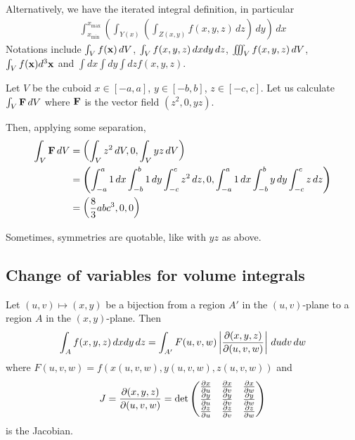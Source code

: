 \documentclass{../../template/note}
\begin{document}
    Alternatively, we have the iterated integral definition, in particular
    \begin{align*}
        \int_{x_{\min}}^{x_\text{max}}\left(\int_{Y(x)}\left(\int_{Z(x,y)}f(x, y, z) \, dz\right) \, dy\right) \, dx
    \end{align*}
    Notations include \(\int_V f(\V x) \D V\), \(\int_V f(x, y, z) \,d{x} dy \, dz\), \(\iiint_V f(x, y, z) \,d{V}\), \(\int_V f(\V x) d^3 \V x\) and \(\int dx \int dy \int dz f(x, y, z)\).

    \begin{example*}
        Let \(V\) be the cuboid \(x \in [-a, a]\), \(y \in [-b, b]\), \(z \in [-c, c]\). Let us calculate \(\int_V \V F \D V\) where \(\V F\) is the vector field \((z^2, 0, yz)\).

        Then, applying some separation,
        \begin{align*}
            \int_V \V F \D V &= \left(\int_V z^2 \D V, 0, \int_V yz \D V\right) \\
            &= \left(\int_{-a}^a 1 \D x \int_{-b}^b 1 \D y \int_{-c}^c z^2 \D z, 0, \int_{-a}^a 1 \D x \int_{-b}^b y \D y \int_{-c}^c z \D z\right) \\
            &= \left(\frac 8 3 abc^3, 0, 0\right)
        \end{align*}
    \end{example*}
    
    \begin{remark*}
        Sometimes, symmetries are quotable, like with \(yz\) as above.
    \end{remark*}
    
    \subsection{Change of variables for volume integrals}
    
    \begin{proposition*}
        Let \((u, v) \mapsto (x, y)\) be a bijection from a region \(A'\) in the \((u, v)\)-plane to a region \(A\) in the \((x, y)\)-plane. Then
        \begin{align*}
            \int_A f(x, y, z) \D x dy \, dz = \int_{A'} F(u, v, w) \left|\pd{(x,y,z)}{(u, v,w)}\right| \D u dv \, dw \\
        \end{align*}
        where \(F(u, v, w) = f(x(u, v, w), y(u, v, w), z(u, v, w))\) and
        \begin{align*}
            J = \pd{(x,y,z)}{(u, v,w)} = \det \begin{pmatrix}
            \pd x u & \pd x v & \pd x w \\
            \pd y u & \pd y v & \pd y w \\
            \pd z u & \pd z v & \pd z w
            \end{pmatrix}
        \end{align*}
        is the Jacobian.
    \end{proposition*}
    
\end{document}

